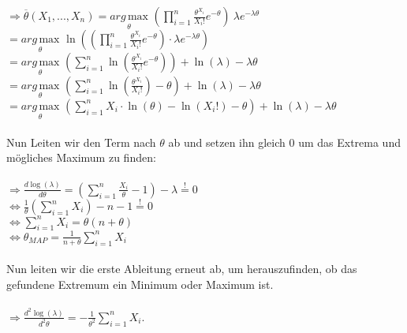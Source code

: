 \documentclass[a4paper]{article}
\begin{document}
$\Rightarrow \overline{\theta}(X_1, ..., X_n) = \underset{\theta}{arg\,\mathrm{max}}\,\, \left( \prod\limits_{i = 1}^n \frac{\theta^{X_i}}{X_i!}e^{- \theta} \right) \ \lambda e^{- \lambda \theta}$\\
\hspace*{2.57cm}$= \underset{\theta}{arg\,\mathrm{max}}\,\, \ln\left(\left( \prod\limits_{i = 1}^n \frac{\theta^{X_i}}{X_i!}e^{- \theta} \right) \cdot \lambda e^{- \lambda \theta} \right)$\\
\hspace*{2.57cm}$= \underset{\theta}{arg\,\mathrm{max}}\,\, \left(\sum\limits_{i = 1}^n \ln\left( \frac{\theta^{X_i}}{X_i!}e^{- \theta} \right)\right) + \ln\left(\lambda \right) - \lambda \theta$\\
\hspace*{2.57cm}$= \underset{\theta}{arg\,\mathrm{max}}\,\, \left(\sum\limits_{i = 1}^n \ln\left( \frac{\theta^{X_i}}{X_i!}\right) - \theta \right) + \ln\left(\lambda \right) - \lambda \theta$\\
\hspace*{2.57cm}$= \underset{\theta}{arg\,\mathrm{max}}\,\, \left(\sum\limits_{i = 1}^n X_i \cdot \ln\left( \theta\right) - \ln\left( X_i! \right) - \theta \right) + \ln\left(\lambda \right) - \lambda \theta$\\\\
Nun Leiten wir den Term nach $\theta$ ab und setzen  ihn gleich 0 um das Extrema und mögliches Maximum zu finden:\\\\
$\Rightarrow \frac{d \log(\lambda)}{d \theta} = \left( \sum\limits_{i = 1}^n \frac{X_i}{\theta} - 1 \right) - \lambda \overset{!}{=} 0$\\
\hspace*{1.27cm}$\Leftrightarrow \frac{1}{\theta} \left(\sum\limits_{i = 1}^n X_i \right) - n - 1 \overset{!}{=} 0$\\
\hspace*{3.3cm}$\Leftrightarrow \sum\limits_{i = 1}^n X_i = \theta (n + \theta)$\\
\hspace*{3.3cm}$\Leftrightarrow \theta_{MAP} = \frac{1}{n + \theta} \sum\limits_{i = 1}^n X_i$\\\\
Nun leiten wir die erste Ableitung erneut ab, um herauszufinden, ob das gefundene Extremum ein Minimum oder Maximum ist.\\\\
$\Rightarrow \frac{d^2\log(\lambda)}{d^2 \theta} = - \frac{1}{\theta^2} \sum\limits_{i = 1}^n X_i$.\\\\
\end{document}
